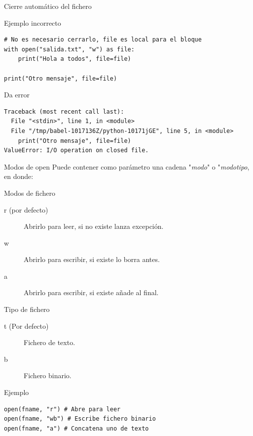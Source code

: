 \documentclass[bigger,unknownkeysallowed]{beamer}
\begin{document}
\begin{frame}[fragile,label={sec:orgb643684}]{Cierre automático del fichero}
 \begin{block}{Ejemplo incorrecto}
\begin{verbatim}
# No es necesario cerrarlo, file es local para el bloque
with open("salida.txt", "w") as file:
    print("Hola a todos", file=file)

print("Otro mensaje", file=file)
\end{verbatim}
\end{block}

\begin{alertblock}{Da error}
\scriptsize
\begin{verbatim}
Traceback (most recent call last):
  File "<stdin>", line 1, in <module>
  File "/tmp/babel-1017136Z/python-10171jGE", line 5, in <module>
    print("Otro mensaje", file=file)
ValueError: I/O operation on closed file.
\end{verbatim}
\end{alertblock}
\end{frame}

\begin{frame}[fragile,label={sec:org3e9f57c}]{Modos de open}
 Puede contener como parámetro una cadena "\emph{modo}" o "\emph{modotipo}, en donde:

\begin{block}{Modos de fichero}
\begin{description}
\item[{r (por defecto)}] Abrirlo para leer, si no existe lanza excepción.

\item[{w}] Abrirlo para escribir, si existe lo borra antes.

\item[{a}] Abrirlo para escribir, si existe añade al final.
\end{description}
\end{block}

\begin{block}{Tipo de fichero}
\begin{description}
\item[{t (Por defecto)}] Fichero de texto.

\item[{b}] Fichero binario.
\end{description}
\end{block}

\begin{block}{Ejemplo}
\begin{verbatim}
open(fname, "r") # Abre para leer
open(fname, "wb") # Escribe fichero binario
open(fname, "a") # Concatena uno de texto
\end{verbatim}
\end{block}
\end{frame}
\end{document}
